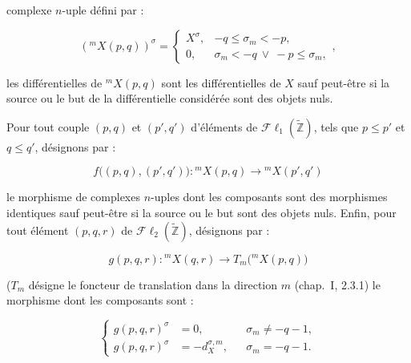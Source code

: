 \clearpage
{}%
\begingroup\small\setlength{\parskip}{0pt}\setlength{\emergencystretch}{1.5em}
\setlength{\abovedisplayskip}{4pt plus 2pt minus 2pt}%
\setlength{\belowdisplayskip}{4pt plus 2pt minus 2pt}%

\noindent complexe $n$-uple défini par :

\begin{equation}
({}^{m}\!X(p,q))^\sigma=
\begin{cases}
X^\sigma,&-q\leq\sigma_m<-p,\\
0,&\sigma_m<-q\ \lor\ -p\leq\sigma_m,
\end{cases},
\tag{4.1.6.1}
\end{equation}

\noindent les différentielles de ${}^{m}\!X(p,q)$ sont les différentielles de $X$
sauf peut-être si la source ou le but de la différentielle considérée sont
des objets nuls.

Pour tout couple $(p,q)$ et $(p',q')$ d'éléments de
$\mathcal{F}\ell_1(\widetilde{\mathbb Z})$, tels que $p\leq p'$ et
$q\leq q'$, désignons par :

\begin{equation}
f\bigl((p,q),(p',q')\bigr)\colon
{}^{m}\!X(p,q)\longrightarrow{}^{m}\!X(p',q')
\tag{4.1.6.2}
\end{equation}

le morphisme de complexes $n$-uples dont les composants sont des
morphismes identiques sauf peut-être si la source ou le but sont des objets
nuls. Enfin, pour tout élément $(p,q,r)$ de
$\mathcal{F}\ell_2(\widetilde{\mathbb Z})$, désignons par :

\begin{equation}
g(p,q,r)\colon{}^{m}\!X(q,r)
\longrightarrow T_m\bigl({}^{m}\!X(p,q)\bigr)
\tag{4.1.6.3}
\end{equation}

($T_m$ désigne le foncteur de translation dans la direction $m$
(chap.~I, 2.3.1) le morphisme dont les composants sont :

\begin{equation}
\left\{
\begin{aligned}
g(p,q,r)^\sigma&=0,
  &&\sigma_m\neq-q-1,\\
g(p,q,r)^\sigma&=-d_X^{\sigma,m},
  &&\sigma_m=-q-1.
\end{aligned}
\right.
\tag{4.1.6.4}
\end{equation}

